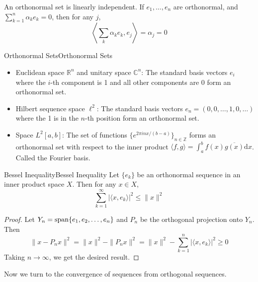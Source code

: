 \documentclass[../main.tex]{subfiles}
\begin{document}
An orthonormal set is linearly independent. If $e_1 , \ldots ,e_n$ are orthonormal, and $\sum_{k=1}^n \alpha_k e_k = 0$, then for any $j$,
\begin{equation*}
	\left<\sum_{k} \alpha_k e_k,e_j \right> = \alpha_j = 0
\end{equation*}

\begin{example}{Orthonormal Sets}{Orthonormal Sets}
	\begin{itemize}
		\item Euclidean space $\mathbb{R}^n$ and unitary space $\mathbb{C}^n$: The standard basis vectors $e_i$ where the $i$-th component is 1 and all other components are 0 form an orthonormal set.
		\item Hilbert sequence space $\ell^2$: The standard basis vectors $e_n = (0,0,\ldots,1,0,\ldots)$ where the 1 is in the $n$-th position form an orthonormal set.
		\item Space $L^2[a,b]$: The set of functions $\displaystyle \{e^{2\pi i n x/(b-a)}\}_{n \in \mathbb{Z}}$ forms an orthonormal set with respect to the inner product $\displaystyle \langle f, g \rangle = \int_a^b f(x) \overline{g(x)} \mathrm{d} x$. Called the Fourier basis.
	\end{itemize}
\end{example}

\begin{theorem}{Bessel Inequality}{Bessel Inequality}
	Let $\{e_k\}$ be an orthonormal sequence in an inner product space $X$. Then for any $x\in X$,
	\begin{equation}
		\sum_{k=1}^\infty |\langle x, e_k \rangle|^2 \leq \|x\|^2
	\end{equation}
\end{theorem}
\begin{proof}
	Let $Y_n = \operatorname{span}\{e_1, e_2, \ldots, e_n\}$ and $P_n$ be the orthogonal projection onto $Y_n$. Then
	\begin{equation*}
		\|x - P_n x\|^2 = \|x\|^2 - \|P_n x\|^2 = \|x\|^2 - \sum_{k=1}^n |\langle x, e_k \rangle|^2 \geq 0
	\end{equation*}
	Taking $n \to \infty$, we get the desired result.
\end{proof}

Now we turn to the convergence of sequences from orthogonal sequences.
\end{document}
